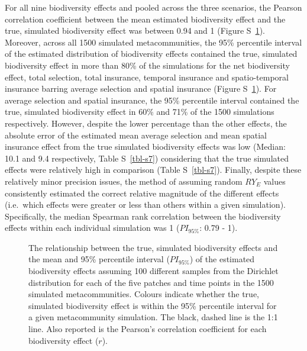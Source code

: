 \documentclass[
  letterpaper,
  DIV=11,
  numbers=noendperiod]{scrartcl}
\begin{document}
For all nine biodiversity effects and pooled across the three scenarios,
the Pearson correlation coefficient between the mean estimated
biodiversity effect and the true, simulated biodiversity effect was
between 0.94 and 1 (Figure S~\ref{fig-s11}). Moreover, across all 1500
simulated metacommunities, the 95\% percentile interval of the estimated
distribution of biodiversity effects contained the true, simulated
biodiversity effect in more than 80\% of the simulations for the net
biodiversity effect, total selection, total insurance, temporal
insurance and spatio-temporal insurance barring average selection and
spatial insurance (Figure S~\ref{fig-s11}). For average selection and
spatial insurance, the 95\% percentile interval contained the true,
simulated biodiversity effect in 60\% and 71\% of the 1500 simulations
respectively. However, despite the lower percentage than the other
effects, the absolute error of the estimated mean average selection and
mean spatial insurance effect from the true simulated biodiversity
effects was low (Median: 10.1 and 9.4 respectively, Table
S~\ref{tbl-s7}) considering that the true simulated effects were
relatively high in comparison (Table S~\ref{tbl-s7}). Finally, despite
these relatively minor precision issues, the method of assuming random
\(RY_E\) values consistently estimated the correct relative magnitude of
the different effects (i.e.~which effects were greater or less than
others within a given simulation). Specifically, the median Spearman
rank correlation between the biodiversity effects within each individual
simulation was 1 (\(PI_{95\%}\): 0.79 - 1).

\begin{figure}


\caption{\label{fig-s11}The relationship between the true, simulated
biodiversity effects and the mean and 95\% percentile interval
(\(PI_{95\%}\)) of the estimated biodiversity effects assuming 100
different samples from the Dirichlet distribution for each of the five
patches and time points in the 1500 simulated metacommunities. Colours
indicate whether the true, simulated biodiversity effect is within the
95\% percentile interval for a given metacommunity simulation. The
black, dashed line is the 1:1 line. Also reported is the Pearson's
correlation coefficient for each biodiversity effect (\(r\)).}

\end{figure}%
\end{document}
